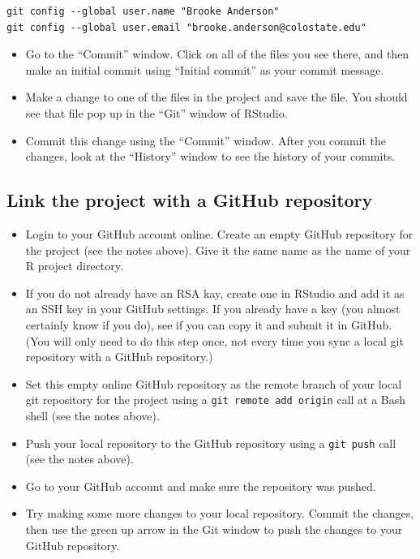 \documentclass[]{tufte-book}
\providecommand{\tightlist}{%
  \setlength{\itemsep}{0pt}\setlength{\parskip}{0pt}}
\begin{document}
\begin{verbatim}
git config --global user.name "Brooke Anderson"
git config --global user.email "brooke.anderson@colostate.edu"
\end{verbatim}

\begin{itemize}
\tightlist
\item
  Go to the ``Commit'' window. Click on all of the files you see there, and then
  make an initial commit using ``Initial commit'' as your commit message.
\item
  Make a change to one of the files in the project and save the file. You should
  see that file pop up in the ``Git'' window of RStudio.
\item
  Commit this change using the ``Commit'' window. After you commit the changes,
  look at the ``History'' window to see the history of your commits.
\end{itemize}

\hypertarget{link-the-project-with-a-github-repository}{%
\subsection{Link the project with a GitHub repository}\label{link-the-project-with-a-github-repository}}

\begin{itemize}
\tightlist
\item
  Login to your GitHub account online. Create an empty GitHub repository for the
  project (see the notes above). Give it the same name as the name of your R project directory.
\item
  If you do not already have an RSA kay, create one in RStudio and add it as an
  SSH key in your GitHub settings. If you already have a key (you almost certainly
  know if you do), see if you can copy it and submit it in GitHub. (You will only need
  to do this step once, not every time you sync a local git repository with a GitHub
  repository.)
\item
  Set this empty online GitHub repository as the remote branch of your local git
  repository for the project using a \texttt{git\ remote\ add\ origin} call at a Bash shell
  (see the notes above).
\item
  Push your local repository to the GitHub repository using a \texttt{git\ push} call
  (see the notes above).
\item
  Go to your GitHub account and make sure the repository was pushed.
\item
  Try making some more changes to your local repository. Commit the changes,
  then use the green up arrow in the Git window to push the changes to your GitHub
  repository.
\end{itemize}
\end{document}
